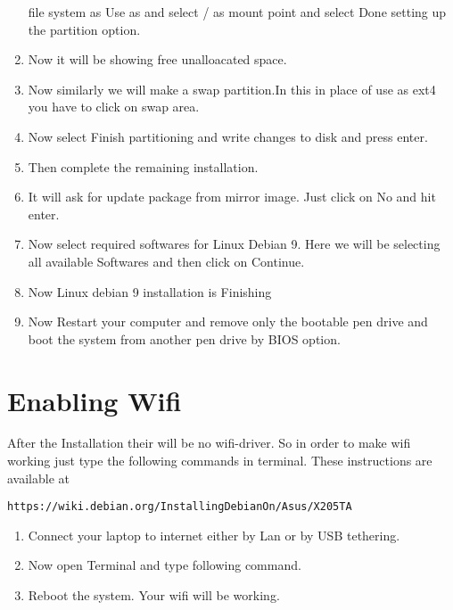 \documentclass[journal,12pt,twocolumn]{IEEEtran}
\begin{document}
\begin{enumerate}
file system as Use as and select / as mount point
and select Done setting up the partition option.
\item Now it will be showing free unalloacated space.
\item Now similarly we will make a swap partition.In this in place of use as ext4 you have to click on swap area.
\item Now select Finish partitioning and write changes to disk and press enter.
\item Then complete the remaining installation.
\item It will ask for update package from mirror image. Just click on No and hit enter.
\item Now select required softwares for Linux Debian 9. Here we will be selecting all available Softwares and then click on Continue.
\item Now Linux debian 9 installation is Finishing
\item Now Restart your computer and remove only the bootable pen drive and boot the system from another pen drive by BIOS option.


\end{enumerate}
\section{Enabling Wifi} 
After the Installation their will be no wifi-driver. So in order to make wifi working just type the following commands in terminal.  These instructions are available at
\begin{lstlisting}
https://wiki.debian.org/InstallingDebianOn/Asus/X205TA
\end{lstlisting}


\begin{enumerate}
    \item Connect your laptop to internet either by Lan or by USB tethering.
    
    \item Now open Terminal and type following command.
    
    
    \item Reboot the system. Your wifi will be working.
\end{enumerate}
\end{document}
